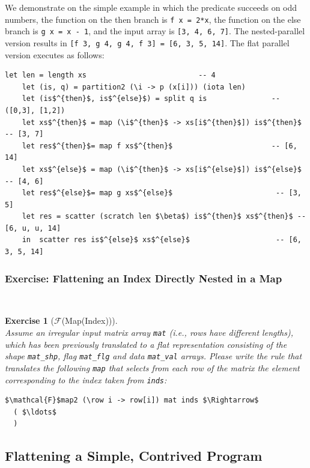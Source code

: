 \documentclass[acmsmall,review]{acmart}\settopmatter{printfolios=true,printccs=false,printacmref=false}
\newtheorem{myexerc}{Exercise}
\begin{document}
We demonstrate on the simple example in which the predicate succeeds on
odd numbers, the function on the then branch is {\tt f x = 2*x}, the
function on the else branch is {\tt g x = x - 1}, and the input array 
is {\tt [3, 4, 6, 7]}. The nested-parallel version results in
{\tt [f 3, g 4, g 4, f 3] = [6, 3, 5, 14]}.
%
The flat parallel version executes as follows:
\begin{lstlisting}[mathescape=true]
    let len = length xs                          -- 4
    let (is, q) = partition2 (\i -> p (x[i])) (iota len)
    let (is$^{then}$, is$^{else}$) = split q is               -- ([0,3], [1,2])
    let xs$^{then}$ = map (\i$^{then}$ -> xs[i$^{then}$]) is$^{then}$     -- [3, 7]
    let res$^{then}$= map f xs$^{then}$                       -- [6, 14]
    let xs$^{else}$ = map (\i$^{then}$ -> xs[i$^{else}$]) is$^{else}$      -- [4, 6]
    let res$^{else}$= map g xs$^{else}$                        -- [3, 5]
    let res = scatter (scratch len $\beta$) is$^{then}$ xs$^{then}$ -- [6, u, u, 14]
    in  scatter res is$^{else}$ xs$^{else}$                    -- [6, 3, 5, 14]
\end{lstlisting}\vspace{-2ex}


\subsubsection{Exercise: Flattening an Index Directly Nested in a Map}
\label{subsubsec:ind-in-map}
$\mbox{ }$

\begin{myexerc}[$\mathcal{F}$(Map(Index))]\label{Flat-Ind-In-Map}
$\mbox{ }$\\
Assume an irregular input matrix array {\tt mat} (i.e., rows have
different lengths), which has been previously translated to 
a flat representation consisting of the shape {\tt mat\_shp}, 
flag {\tt mat\_flg} and data {\tt mat\_val} arrays.
Please write the rule that translates the following \lstinline{map} 
that selects from each row of the matrix the element corresponding
to the index taken from {\tt inds}:
\begin{lstlisting}[mathescape=true]
$\mathcal{F}$map2 (\row i -> row[i]) mat inds $\Rightarrow$
  ( $\ldots$
  )
\end{lstlisting}\vspace{-2ex}
\end{myexerc}

\subsection{Flattening a Simple, Contrived Program}
\label{subsec:flatten-simple-eg}
\end{document}
